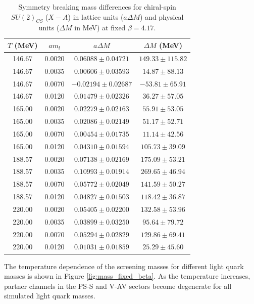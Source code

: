 \begin{table}[H]
\centering
\renewcommand{\arraystretch}{1.2}
\caption{Symmetry breaking mass differences for chiral-spin $SU(2)_{CS}$ ($X-A$) in lattice units ($a\Delta M$) and physical units ($\Delta M$ in MeV) at fixed $\beta=4.17$.}
\label{tab:su2_cs_xa_asym_data}
\begin{tabular}{cccc}
\hline\hline
$T$ (MeV) & $am_l$ & $a\Delta M$ & $\Delta M$ (MeV) \\
\hline
146.67 & 0.0020 & $0.06088 \pm 0.04721$ & $149.33 \pm 115.82$ \\
146.67 & 0.0035 & $0.00606 \pm 0.03593$ & $14.87 \pm 88.13$ \\
146.67 & 0.0070 & $-0.02194 \pm 0.02687$ & $-53.81 \pm 65.91$ \\
146.67 & 0.0120 & $0.01479 \pm 0.02326$ & $36.27 \pm 57.05$ \\
\hline
165.00 & 0.0020 & $0.02279 \pm 0.02163$ & $55.91 \pm 53.05$ \\
165.00 & 0.0035 & $0.02086 \pm 0.02149$ & $51.17 \pm 52.71$ \\
165.00 & 0.0070 & $0.00454 \pm 0.01735$ & $11.14 \pm 42.56$ \\
165.00 & 0.0120 & $0.04310 \pm 0.01594$ & $105.73 \pm 39.09$ \\
\hline
188.57 & 0.0020 & $0.07138 \pm 0.02169$ & $175.09 \pm 53.21$ \\
188.57 & 0.0035 & $0.10993 \pm 0.01914$ & $269.65 \pm 46.94$ \\
188.57 & 0.0070 & $0.05772 \pm 0.02049$ & $141.59 \pm 50.27$ \\
188.57 & 0.0120 & $0.04827 \pm 0.01503$ & $118.42 \pm 36.87$ \\
\hline
220.00 & 0.0020 & $0.05405 \pm 0.02200$ & $132.58 \pm 53.96$ \\
220.00 & 0.0035 & $0.03899 \pm 0.03250$ & $95.64 \pm 79.72$ \\
220.00 & 0.0070 & $0.05294 \pm 0.02829$ & $129.86 \pm 69.41$ \\
220.00 & 0.0120 & $0.01031 \pm 0.01859$ & $25.29 \pm 45.60$ \\
\hline\hline
\end{tabular}
\end{table}

The temperature dependence of the screening masses for different light quark masses is shown in Figure \ref{fig:mass_fixed_beta}. As the temperature increases, partner channels in the PS-S and V-AV sectors become degenerate for all simulated light quark masses.

